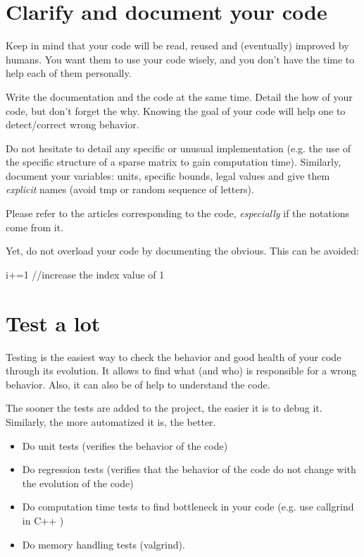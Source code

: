 
\section{Clarify and document your code}
Keep in mind that your code will be read, reused and (eventually) improved by humans.
You want them to use your code wisely, and you don't have the time to help each of them personally.

Write the documentation and the code at the same time. 
Detail the how of your code, but don't forget the why. 
Knowing the goal of your code will help one to detect/correct wrong behavior.

Do not hesitate to detail any specific or unusual implementation
(e.g. the use of the specific structure of a sparse matrix to gain computation time).
Similarly, document your variables: units, specific bounds, legal values and give them \textit{explicit} names (avoid tmp or random sequence of letters).	

Please refer to the articles corresponding to the code, \textit{especially} if the notations come from it.

Yet, do not overload your code by documenting the obvious. This can be avoided:\\
\begin{tt} i+=1 //increase the index value of 1\end{tt}

\section{Test a lot}
Testing is the easiest way to check the behavior and good health of your code through its evolution.
It allows to find what (and who) is responsible for a wrong behavior.
Also, it can also be of help to understand the code.

The sooner the tests are added to the project, the easier it is to debug it.
Similarly, the more automatized it is, the better.
\begin{itemize}[noitemsep,topsep=0pt,parsep=0pt,partopsep=0pt]
\item Do unit tests (verifies the behavior of the code)
\item Do regression tests (verifies that the behavior of the code do not change with the evolution of the code)
\item Do computation time tests to find bottleneck in your code (e.g. use callgrind in C++ )
\item Do memory handling tests (valgrind).
\end{itemize}

